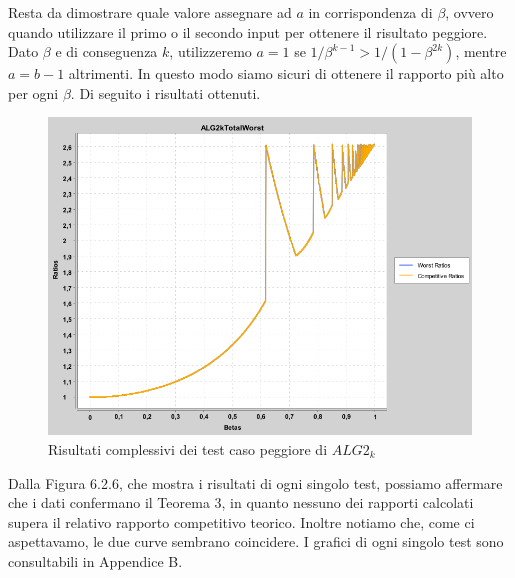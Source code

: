 \documentclass[twoside,openany,titlepage,fleqn,
	headinclude,12pt,a4paper,BCOR5mm,footinclude]{scrbook}
\begin{document}
Resta da dimostrare quale valore assegnare ad $a$ in corrispondenza di $\beta$, ovvero quando utilizzare il primo o il secondo input per ottenere il risultato peggiore. Dato $\beta$ e di conseguenza $k$, utilizzeremo $a=1$ se $1/\beta^{k-1} > 1/(1 - \beta^{2k})$, mentre $a = b-1$ altrimenti. In questo modo siamo sicuri di ottenere il rapporto più alto per ogni $\beta$.
Di seguito i risultati ottenuti.
\begin{figure}[H]
\caption[Unione test caso peggiore $ALG2_{K}$]{Risultati complessivi dei test caso peggiore di $ALG2_{k}$}
\centering
\includegraphics[scale=0.4]{worst/ALG2kTotalWorst.png}
\end{figure}

Dalla Figura 6.2.6, che mostra i risultati di ogni singolo test, possiamo affermare che i dati confermano il Teorema 3, in quanto nessuno dei rapporti calcolati supera il relativo rapporto competitivo teorico. Inoltre notiamo che, come ci aspettavamo, le due curve sembrano coincidere. I grafici di ogni singolo test sono consultabili in Appendice B.
\end{document}

